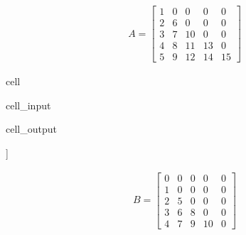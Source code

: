 \documentclass[letterpaper,10pt,english]{jupyterBook}
\begin{document}
\begin{sphinxVerbatim}[commandchars=\\\{\}]
   
     
    \PYG{p}{[}\PYG{p}{]}\PYG{p}{[}\PYG{p}{]}  
\end{sphinxVerbatim}
\begin{equation*}
\begin{split}
A = \begin{bmatrix}
  1 &  0 &  0 &  0 &  0\\
  2 &  6 &  0 &  0 &  0\\
  3 &  7 &  10 &  0 &  0\\
  4 &  8 &  11 &  13 &  0\\
  5 &  9 &  12 &  14 &  15
\end{bmatrix}
\end{split}
\end{equation*}
\begin{sphinxuseclass}{cell}\begin{sphinxVerbatimInput}

\begin{sphinxuseclass}{cell_input}
\begin{sphinxVerbatim}[commandchars=\\\{\}]
   
\end{sphinxVerbatim}

\end{sphinxuseclass}\end{sphinxVerbatimInput}
\begin{sphinxVerbatimOutput}

\begin{sphinxuseclass}{cell_output}
\begin{sphinxVerbatim}[commandchars=\\\{\}]
[[0 0 0 0 0]
 [0 0 0 0 0]
 [0 0 0 0 0]
 [0 0 0 0 0]
 [0 0 0 0 0]]
\end{sphinxVerbatim}

\end{sphinxuseclass}\end{sphinxVerbatimOutput}

\end{sphinxuseclass}\begin{equation*}
\begin{split}
B=\begin{bmatrix}
  0 &  0 &  0 &  0 &  0\\
  1 &  0 &  0 &  0 &  0\\
  2 &  5 &  0 &  0 &  0\\
  3 &  6 &  8 &  0 &  0\\
  4 &  7 &  9 &  10 &  0
\end{bmatrix}
\end{split}
\end{equation*}
\end{document}

